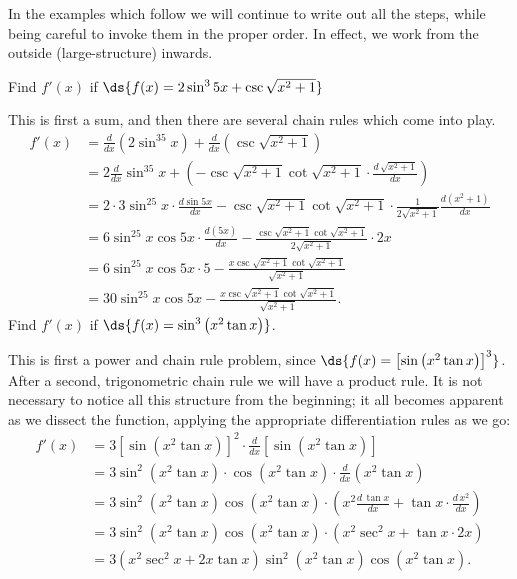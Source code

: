 In the examples which
follow we will continue to write out all the steps, while
being careful to invoke them in the proper order.
In effect, we work from the outside (large-structure)
inwards.

\bex
Find $f'(x)$ if $\ds{f(x)=2\sin^3 5x+\csc\sqrt{x^2+1}}$

\noindent
This is first a sum, and then there are several chain rules
which come into play.  
\begin{align*}
f'(x)&=\frac{d}{dx}\left(2\sin^35x\right)
+\frac{d}{dx}\left(\csc\sqrt{x^2+1}\right)\\
&=2\frac{d}{dx}\sin^35x+\left(-\csc\sqrt{x^2+1}
\cot\sqrt{x^2+1}\cdot\frac{d\,\sqrt{x^2+1}}
{dx}\right)\\
&=2\cdot3\sin^25x\cdot\frac{d\sin5x}{dx}
-\csc\sqrt{x^2+1}\cot\sqrt{x^2+1}\cdot
\frac1{2\sqrt{x^2+1}}\frac{d(x^2+1)}{dx}\\
&=6\sin^25x\cos5x\cdot\frac{d(5x)}{dx}
-\frac{\csc\sqrt{x^2+1}\cot\sqrt{x^2+1}}{2\sqrt{x^2+1}}\cdot2x\\
&=6\sin^25x\cos5x\cdot5-\frac{x\csc\sqrt{x^2+1}\cot\sqrt{x^2+1}}
{\sqrt{x^2+1}}\\
&=30\sin^25x\cos5x-\frac{x\csc\sqrt{x^2+1}\cot\sqrt{x^2+1}}
{\sqrt{x^2+1}}.\end{align*}
\eex
\bex Find $f'(x)$ if $\ds{f(x)=\sin^3\left(x^2\tan x\right)}$.

\noindent This is first a power and chain rule problem,
since $\ds{f(x)=\left[\sin\left(x^2\tan x\right)\right]^3}$.
After a second, trigonometric chain rule we will have a product rule.
It is not necessary to notice all this structure from the beginning;
it all becomes apparent as we dissect the 
function, applying
the appropriate differentiation rules as we go:
\begin{align*}
f'(x)&=3\left[\sin\left(x^2\tan x\right)\right]^2
\cdot\frac{d}{dx}\left[\sin\left(x^2\tan x\right)\right]\\
&=3\sin^2\left(x^2\tan x\right)\cdot\cos(x^2\tan x)\cdot
\frac{d}{dx}\left(x^2\tan x\right)\\
&=3\sin^2\left(x^2\tan x\right)\cos(x^2\tan x)
\cdot\left(x^2\frac{d\,\tan x}{dx}+\tan x\cdot\frac{d\,x^2}{dx}\right)
\\
&=3\sin^2\left(x^2\tan x\right)\cos\left(x^2\tan x\right)
\cdot\left(x^2\sec^2x+\tan x\cdot 2x\right)\\
&=3\left(x^2\sec^2x+2x\tan x\right)
\sin^2\left(x^2\tan x\right)\cos\left(x^2\tan x\right).
\end{align*}
\eex



